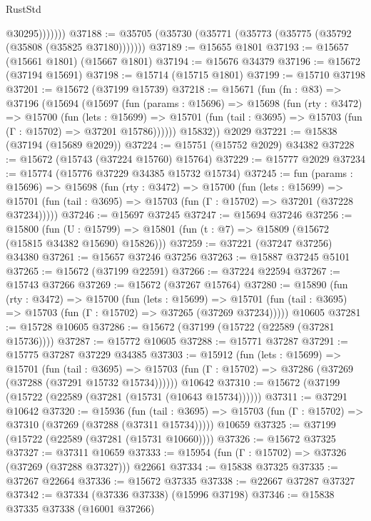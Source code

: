 \begin{lexlean}{RustStd}
\begin{coremodule}
                  @30295)))))))
@37188 := @35705 (@35730 (@35771 (@35773 (@35775 (@35792 (@35808 (@35825 @37180)))))))
@37189 := @15655 @1801
@37193 := @15657 (@15661 @1801) (@15667 @1801)
@37194 := @15676 @34379
@37196 := @15672 (@37194 @15691)
@37198 := @15714 (@15715 @1801)
@37199 := @15710 @37198
@37201 := @15672 (@37199 @15739)
@37218 := @15671
    (fun (fn : @83) =>
    @37196
      (@15694
        (@15697
          (fun (params : @15696) =>
          @15698
            (fun (rty : @3472) =>
            @15700
              (fun (lets : @15699) =>
              @15701 (fun (tail : @3695) => @15703 (fun (Γ : @15702) => @37201 @15786))))))
        @15832))
    @2029
@37221 := @15838 (@37194 (@15689 @2029))
@37224 := @15751 (@15752 @2029) @34382
@37228 := @15672 (@15743 (@37224 @15760) @15764)
@37229 := @15777 @2029
@37234 := @15774 (@15776 @37229 @34385 @15732 @15734)
@37245 := fun (params : @15696) =>
  @15698
    (fun (rty : @3472) =>
    @15700
      (fun (lets : @15699) =>
      @15701 (fun (tail : @3695) => @15703 (fun (Γ : @15702) => @37201 (@37228 @37234)))))
@37246 := @15697 @37245
@37247 := @15694 @37246
@37256 := @15800
    (fun (U : @15799) => @15801 (fun (t : @7) => @15809 (@15672 (@15815 @34382 @15690) @15826)))
@37259 := @37221 (@37247 @37256) @34380
@37261 := @15657 @37246 @37256
@37263 := @15887 @37245 @5101
@37265 := @15672 (@37199 @22591)
@37266 := @37224 @22594
@37267 := @15743 @37266
@37269 := @15672 (@37267 @15764)
@37280 := @15890
    (fun (rty : @3472) =>
    @15700
      (fun (lets : @15699) =>
      @15701 (fun (tail : @3695) => @15703 (fun (Γ : @15702) => @37265 (@37269 @37234)))))
    @10605
@37281 := @15728 @10605
@37286 := @15672 (@37199 (@15722 (@22589 (@37281 @15736))))
@37287 := @15772 @10605
@37288 := @15771 @37287
@37291 := @15775 @37287 @37229 @34385
@37303 := @15912
    (fun (lets : @15699) =>
    @15701
      (fun (tail : @3695) =>
      @15703 (fun (Γ : @15702) => @37286 (@37269 (@37288 (@37291 @15732 @15734))))))
    @10642
@37310 := @15672 (@37199 (@15722 (@22589 (@37281 (@15731 (@10643 @15734))))))
@37311 := @37291 @10642
@37320 := @15936
    (fun (tail : @3695) => @15703 (fun (Γ : @15702) => @37310 (@37269 (@37288 (@37311 @15734)))))
    @10659
@37325 := @37199 (@15722 (@22589 (@37281 (@15731 @10660))))
@37326 := @15672 @37325
@37327 := @37311 @10659
@37333 := @15954 (fun (Γ : @15702) => @37326 (@37269 (@37288 @37327))) @22661
@37334 := @15838 @37325
@37335 := @37267 @22664
@37336 := @15672 @37335
@37338 := @22667 @37287 @37327
@37342 := @37334 (@37336 @37338) (@15996 @37198)
@37346 := @15838 @37335 @37338 (@16001 @37266)

\end{coremodule}
\end{lexlean}
